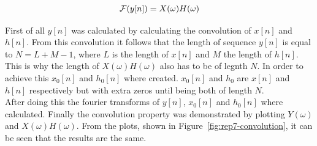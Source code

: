 \documentclass[11pt,titlepage]{report}
\begin{document}
\begin{equation}
\centering
 \mathcal{F}(y[n]) = X(\omega)H(\omega)
\end{equation}

First of all $y[n]$ was calculated by calculating the convolution of $x[n]$ and $h[n]$. From this convolution it follows that the length of sequence $y[n]$ is equal to $N = L + M - 1$, where $L$ is the length of $x[n]$ and $M$ the length of $h[n]$. This is why the length of $X(\omega)H(\omega)$ also has to be of legnth $N$. In order to achieve this $x_{0}[n]$ and $h_{0}[n]$ where created. $x_{0}[n]$ and $h_{0}$ are $x[n]$ and $h[n]$ respectively but with extra zeros until being both of length $N$. \\
After doing this the fourier transforms of $y[n]$, $x_{0}[n]$ and $h_{0}[n]$ where calculated. Finally the convolution property was demonstrated by plotting $Y(\omega)$ and $X(\omega)H(\omega)$. From the plots, shown in Figure~\ref{fig:rep7-convolution}, it  can be seen that the results are the same.
\end{document}
